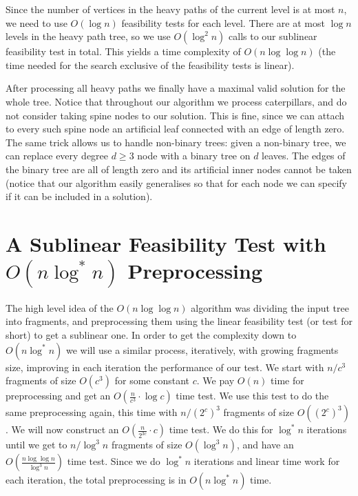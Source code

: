 \documentclass[11pt,a4paper]{article}
\theoremstyle{definition}
\theoremstyle{remark}
\begin{document}
Since the number of vertices in the heavy paths of the current level is at most $n$, we need to use $O(\log n)$ feasibility tests for each level. There are at most $\log n$ levels in the heavy path tree, so we use $O(\log ^2n)$ calls to our sublinear feasibility test in total. This yields a time complexity of $O(n \log \log n)$ (the time needed for the search exclusive of the feasibility tests is linear).

After processing all heavy paths we finally have a maximal valid solution for the whole tree.
Notice that throughout our algorithm we process caterpillars, and do not consider taking spine nodes to our solution. 
This is fine, since we can attach to every such spine node an artificial leaf connected with an edge of length zero.
The same trick allows us to handle non-binary trees: given a non-binary tree, we can replace every 
degree $d\geq 3$ node with a binary tree on $d$ leaves. The edges of the binary tree are all of length zero and
its artificial inner nodes cannot be taken (notice that our algorithm easily generalises so that for each node
we can specify if it can be included in a solution).

\section{A Sublinear Feasibility Test with \boldmath
$O(n\log^{*}n)$ Preprocessing} \label{sectionlog*}
The high level idea of the $O(n \log \log n)$ algorithm was dividing the input tree into fragments, and preprocessing them using the linear feasibility test (or test for short) to get a sublinear one. In order to get the complexity down to $O(n \log ^*n)$ we will use a similar process, iteratively, with growing fragments size, improving in each iteration the performance of our test.
We start with $n/c^{3}$ fragments of size $O(c^3)$ for some constant $c$.
We pay $O(n)$ time for preprocessing and get an $O(\frac{n}{c^3} \cdot \log c)$ time test.
We use this test to do the same preprocessing again, this time with $n/(2^{c})^{3}$ fragments of size $O((2^c)^3)$.
We will now construct an $O(\frac{n}{2^{3c}} \cdot c)$ time test.
We do this for $\log ^*n$ iterations until we get to $n/\log^{3}n$ fragments of size $O(\log ^3n)$, and have
an $O(\frac{n \log \log n}{\log ^3n})$ time test. Since we do $\log ^*n$ iterations and linear time work for each
iteration, the total preprocessing is in $O(n \log ^*n)$ time.
\end{document}
